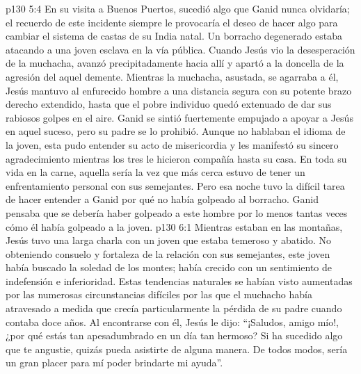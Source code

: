 \vs p130 5:4 En su visita a Buenos Puertos, sucedió algo que Ganid nunca olvidaría; el recuerdo de este incidente siempre le provocaría el deseo de hacer algo para cambiar el sistema de castas de su India natal. Un borracho degenerado estaba atacando a una joven esclava en la vía pública. Cuando Jesús vio la desesperación de la muchacha, avanzó precipitadamente hacia allí y apartó a la doncella de la agresión del aquel demente. Mientras la muchacha, asustada, se agarraba a él, Jesús mantuvo al enfurecido hombre a una distancia segura con su potente brazo derecho extendido, hasta que el pobre individuo quedó extenuado de dar sus rabiosos golpes en el aire. Ganid se sintió fuertemente empujado a apoyar a Jesús en aquel suceso, pero su padre se lo prohibió. Aunque no hablaban el idioma de la joven, esta pudo entender su acto de misericordia y les manifestó su sincero agradecimiento mientras los tres le hicieron compañía hasta su casa. En toda su vida en la carne, aquella sería la vez que más cerca estuvo de tener un enfrentamiento personal con sus semejantes. Pero esa noche tuvo la difícil tarea de hacer entender a Ganid por qué no había golpeado al borracho. Ganid pensaba que se debería haber golpeado a este hombre por lo menos tantas veces cómo él había golpeado a la joven.
\vs p130 6:1 Mientras estaban en las montañas, Jesús tuvo una larga charla con un joven que estaba temeroso y abatido. No obteniendo consuelo y fortaleza de la relación con sus semejantes, este joven había buscado la soledad de los montes; había crecido con un sentimiento de indefensión e inferioridad. Estas tendencias naturales se habían visto aumentadas por las numerosas circunstancias difíciles por las que el muchacho había atravesado a medida que crecía particularmente la pérdida de su padre cuando contaba doce años. Al encontrarse con él, Jesús le dijo: “¡Saludos, amigo mío!, ¿por qué estás tan apesadumbrado en un día tan hermoso? Si ha sucedido algo que te angustie, quizás pueda asistirte de alguna manera. De todos modos, sería un gran placer para mí poder brindarte mi ayuda”.

